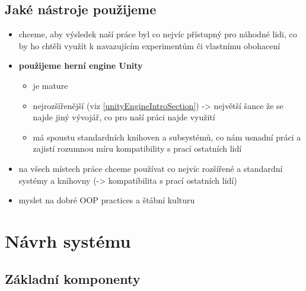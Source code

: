 \subsection{Jaké nástroje použijeme}

\begin{itemize}
    \item chceme, aby výsledek naší práce byl co nejvíc přístupný pro náhodné lidi, co by ho chtěli využít k navazujícím experimentům či vlastnímu obohacení
    \item \textbf{použijeme herní engine Unity}
        \begin{itemize}
            \item je mature
            \item nejrozšířenější (viz \ref{unityEngineIntroSection}) -> největší šance že se najde jiný vývojář, co pro naší práci najde využití
            \item má spoustu standardních knihoven a subsystémů, co nám usnadní práci a zajistí rozumnou míru kompatibility s prací ostatních lidí
        \end{itemize}
    \item na všech místech práce chceme používat co nejvíc rozšířené a standardní systémy a knihovny (-> kompatibilita s prací ostatních lidí)
    \item myslet na dobré OOP practices a štábní kulturu
\end{itemize}



\section{Návrh systému}

\subsection{Základní komponenty}


